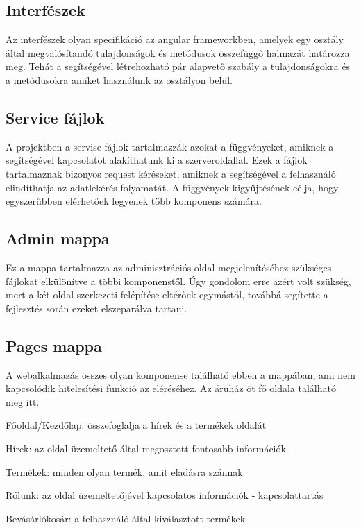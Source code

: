 \subsection{Interfészek}
Az interfészek olyan specifikáció az angular frameworkben, amelyek egy osztály által megvalósítandó tulajdonságok és metódusok összefüggő halmazát határozza meg. Tehát a segítségével létrehozható pár alapvető szabály a tulajdonságokra és a metódusokra amiket használunk az osztályon belül.

\subsection{Service fájlok}
A projektben a servise fájlok tartalmazzák azokat a függvényeket, amiknek a segítségével kapcsolatot alakíthatunk ki a szerveroldallal. Ezek a fájlok tartalmaznak bizonyos request kéréseket, amiknek a segítségével a felhasználó elindíthatja az adatlekérés folyamatát. A függvények kigyűjtésének célja, hogy egyszerűbben elérhetőek legyenek több komponens számára.

\subsection{Admin mappa}
Ez a mappa tartalmazza az adminisztrációs oldal megjelenítéséhez szükséges fájlokat elkülönítve a többi komponenstől. Úgy gondolom erre azért volt szükség, mert a két oldal szerkezeti felépítése eltérőek egymástól, továbbá segítette a fejlesztés során ezeket elszeparálva tartani.

\subsection{Pages mappa}
A webalkalmazás összes olyan komponense található ebben a mappában, ami nem kapcsolódik hitelesítési funkció az eléréséhez. Az áruház öt fő oldala található meg itt.

\begin{compactitem}
	\item Főoldal/Kezdőlap: összefoglalja a hírek és a termékek oldalát
	\item Hírek: az oldal üzemeltető által megosztott fontosabb információk
	\item Termékek: minden olyan termék, amit eladásra szánnak
	\item Rólunk: az oldal üzemeltetőjével kapcsolatos információk - kapcsolattartás
	\item Bevásárlókosár:  a felhasználó által kiválasztott termékek
\end{compactitem}

